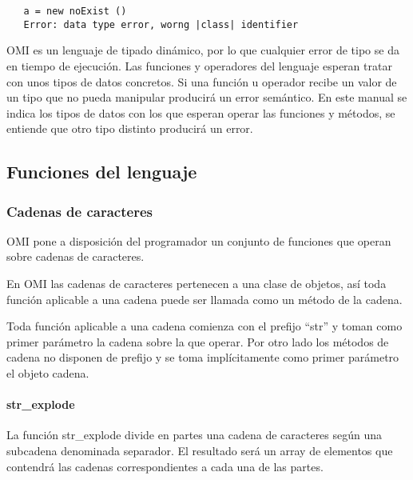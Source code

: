 \begin{lstlisting}
   a = new noExist ()
   Error: data type error, worng |class| identifier
\end{lstlisting}

OMI es un lenguaje de tipado dinámico, por lo que cualquier error de tipo se da en tiempo de ejecución. Las funciones y operadores
del lenguaje esperan tratar con unos tipos de datos concretos. Si una función u operador recibe un valor de un tipo 
que no pueda manipular producirá un error semántico. En este manual se indica los tipos de datos con los que esperan operar 
las funciones y métodos, se entiende que otro tipo distinto producirá un error. 

\subsection{Funciones del lenguaje}
\subsubsection{Cadenas de caracteres}
OMI pone a disposición del programador un conjunto de funciones que operan sobre cadenas de caracteres.

En OMI las cadenas de caracteres pertenecen a una clase de objetos, así toda función aplicable a una cadena
puede ser llamada como un método de la cadena. 

Toda función aplicable a una cadena comienza con el prefijo ``str'' y toman como primer parámetro la cadena sobre la que 
operar. Por otro lado los métodos de cadena no disponen de prefijo y se toma implícitamente como primer parámetro el objeto 
cadena. 



\paragraph {str\_explode}
La función str\_explode divide en partes una cadena de caracteres según una subcadena denominada separador. El resultado 
será un array de elementos que contendrá las cadenas correspondientes a cada una de las partes. 

